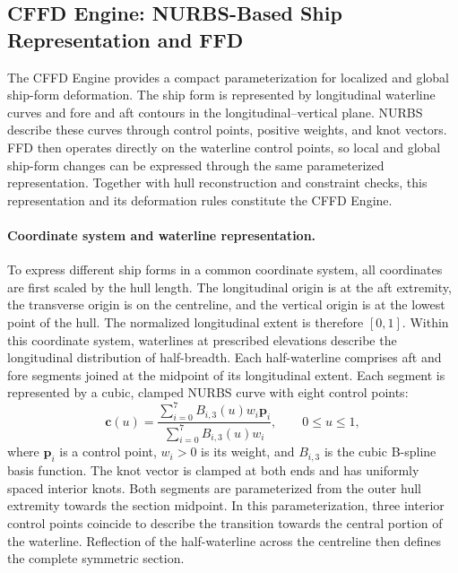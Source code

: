 \documentclass[a4paper,fleqn]{cas-dc}
\begin{document}
\subsection{CFFD Engine: NURBS-Based Ship Representation and FFD}
\label{sec:nurbs-ffd}

The CFFD Engine provides a compact parameterization for localized and global
ship-form deformation. The ship form is represented by longitudinal waterline
curves and fore and aft contours in the longitudinal--vertical plane. NURBS
describe these curves through control points, positive weights, and knot vectors.
FFD then operates directly on the waterline control points, so local and global
ship-form changes can be expressed through the same parameterized representation.
Together with hull reconstruction and constraint checks, this representation and
its deformation rules constitute the CFFD Engine.

\paragraph{Coordinate system and waterline representation.}
To express different ship forms in a common coordinate system, all coordinates
are first scaled by the hull length. The longitudinal origin is at the aft
extremity, the transverse origin is on the centreline, and the vertical origin is
at the lowest point of the hull. The normalized longitudinal extent is therefore
$[0,1]$. Within this coordinate system, waterlines at prescribed elevations
describe the longitudinal distribution of half-breadth. Each half-waterline
comprises aft and fore segments joined at the midpoint of its longitudinal
extent. Each segment is represented by a cubic, clamped NURBS curve with eight
control points:
\begin{equation}
 \mathbf{c}(u)=
 \frac{\sum_{i=0}^{7} B_{i,3}(u)w_i\mathbf{p}_i}
      {\sum_{i=0}^{7} B_{i,3}(u)w_i},
 \qquad 0\leq u\leq 1,
 \label{eq:waterline-nurbs}
\end{equation}
where $\mathbf{p}_i$ is a control point, $w_i>0$ is its weight, and $B_{i,3}$ is
the cubic B-spline basis function. The knot vector is clamped at both ends and
has uniformly spaced interior knots. Both segments are parameterized from the outer hull extremity towards the
section midpoint. In this parameterization, three interior control points
coincide to describe the transition towards the central portion of the waterline.
Reflection of the half-waterline across the centreline then defines the complete
symmetric section.
\end{document}
